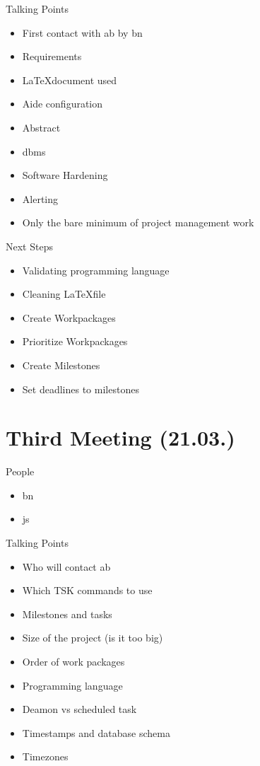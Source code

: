 Talking Points
\begin{itemize}
    \item First contact with \gls{ab} by \gls{bn}
    \item Requirements
    \item \LaTeX document used
    \item Aide configuration
    \item Abstract
    \item \gls{dbms}
    \item Software Hardening
    \item Alerting
    \item Only the bare minimum of project management work
\end{itemize}

Next Steps
\begin{itemize}
    \item Validating programming language
    \item Cleaning \LaTeX file
    \item Create Workpackages
    \item Prioritize Workpackages 
    \item Create Milestones
    \item Set deadlines to milestones
\end{itemize}

\section{Third Meeting (21.03.)}
\label{sec:meeting03}

People
\begin{itemize}
    \item \gls{bn}
    \item \gls{js}
\end{itemize}

Talking Points
\begin{itemize}
    \item Who will contact \gls{ab}
    \item Which TSK commands to use
    \item Milestones and tasks
    \item Size of the project (is it too big)
    \item Order of work packages
    \item Programming language
    \item Deamon vs scheduled task
    \item Timestamps and database schema
    \item Timezones
\end{itemize}

